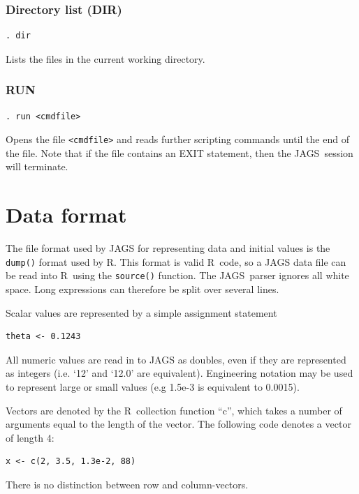 \documentclass[11pt, a4paper, titlepage]{report}
\newcommand{\JAGS}{\textsf{JAGS}}
\newcommand{\R}{\textsf{R}}
\begin{document}
\subsubsection{Directory list (DIR)}
\begin{verbatim}
. dir
\end{verbatim}
Lists the files in the current working directory.

\subsubsection{RUN}
\begin{verbatim}
. run <cmdfile>
\end{verbatim}
Opens the file \texttt{<cmdfile>} and reads further scripting commands
until the end of the file.  Note that if the file contains an EXIT
statement, then the \JAGS\ session will terminate. 

\section{Data format}
\label{section:cmdline:data}

The file format used by JAGS for representing data and initial values
is the \verb+dump()+ format used by \R.  This format is valid \R\ code,
so a JAGS data file can be read into \R\ using the \verb+source()+ function.
The \JAGS\ parser ignores all white space.  Long expressions can
therefore be split over several lines.

Scalar values are represented by a simple assignment statement 
\begin{verbatim}
theta <- 0.1243
\end{verbatim}
All numeric values are read in to JAGS as doubles, even if they are
represented as integers (i.e. `12' and `12.0' are
equivalent). Engineering notation may be used to represent large or
small values (e.g 1.5e-3 is equivalent to 0.0015).

Vectors are denoted by the \R\ collection function ``c'', which takes
a number of arguments equal to the length of the vector.  The
following code denotes a vector of length 4:
\begin{verbatim}
x <- c(2, 3.5, 1.3e-2, 88)
\end{verbatim}
There is no distinction between row and column-vectors. 
\end{document}
